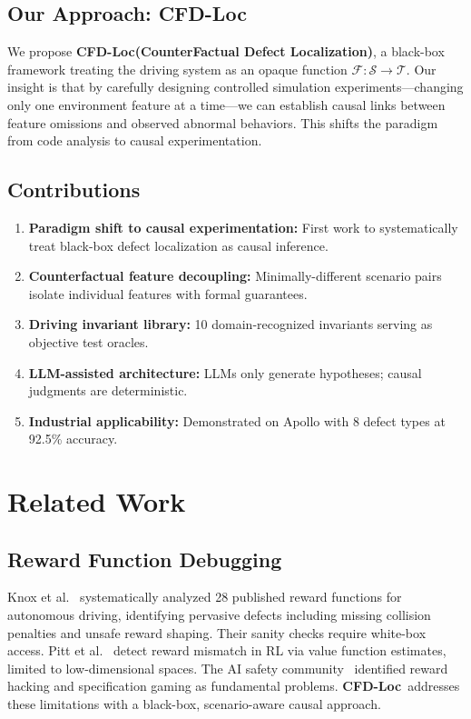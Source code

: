 \documentclass[conference]{IEEEtran}
\theoremstyle{plain}
\newcommand{\methodname}{\textbf{CFD-Loc}}
\newcommand{\scenario}{\mathcal{S}}
\newcommand{\traj}{\mathcal{T}}
\newcommand{\sys}{\mathcal{F}}
\begin{document}
\subsection{Our Approach: \methodname}

We propose \methodname\textbf{(CounterFactual Defect Localization)}, a black-box framework treating the driving system as an opaque function $\sys: \scenario \to \traj$. Our insight is that by carefully designing controlled simulation experiments---changing only one environment feature at a time---we can establish causal links between feature omissions and observed abnormal behaviors. This shifts the paradigm from code analysis to causal experimentation.

\subsection{Contributions}

\begin{enumerate}
    \item \textbf{Paradigm shift to causal experimentation:} First work to systematically treat black-box defect localization as causal inference.
    \item \textbf{Counterfactual feature decoupling:} Minimally-different scenario pairs isolate individual features with formal guarantees.
    \item \textbf{Driving invariant library:} 10 domain-recognized invariants serving as objective test oracles.
    \item \textbf{LLM-assisted architecture:} LLMs only generate hypotheses; causal judgments are deterministic.
    \item \textbf{Industrial applicability:} Demonstrated on Apollo with 8 defect types at 92.5\% accuracy.
\end{enumerate}

\section{Related Work}
\label{sec:related}

\subsection{Reward Function Debugging}
Knox et al.~\cite{knox2023reward} systematically analyzed 28 published reward functions for autonomous driving, identifying pervasive defects including missing collision penalties and unsafe reward shaping. Their sanity checks require white-box access. Pitt et al.~\cite{pitt2018diagnosis} detect reward mismatch in RL via value function estimates, limited to low-dimensional spaces. The AI safety community~\cite{amodei2016specification} identified reward hacking and specification gaming as fundamental problems. \methodname\ addresses these limitations with a black-box, scenario-aware causal approach.
\end{document}
